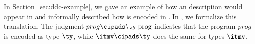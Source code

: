 
In Section~\ref{sec:ddc-example}, we gave an example of how an
\ipads{} description would appear in \ddc{} and informally described
how \ipads{} is encoded in \ddc{}. In , we
formalize this translation. The judgment ${prog} \cipads \ty\;
\text{prog}$ indicates that the \ipads{} program ${prog}$ is encoded
as \ddc{} type $\ty$, while $\itmv \cipads \ty$ does the same
for \ipads{} types $\itmv$.

